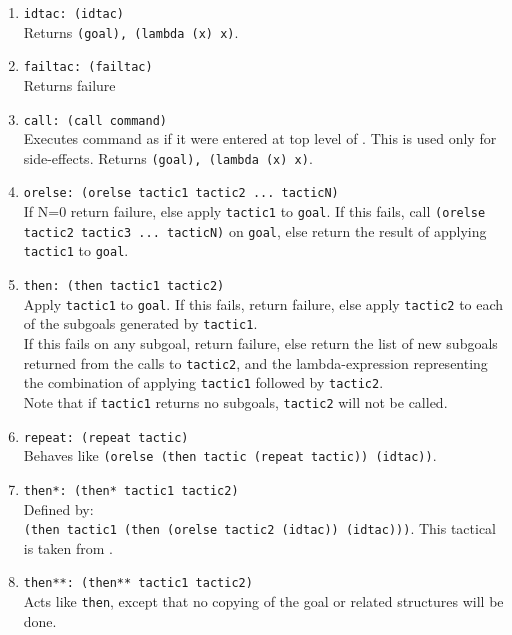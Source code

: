 \begin{enumerate}
\item {\tt idtac: (idtac)} \\
Returns {\tt (goal), (lambda (x) x)}.

\item {\tt failtac: (failtac)}\\
Returns failure

\item {\tt call: (call command)}\\
Executes command as if it were entered at top level of \tps.  This is used
only for side-effects.  Returns {\tt (goal), (lambda (x) x)}.

\item {\tt orelse: (orelse tactic1 tactic2 ... tacticN)}\\
If N=0 return failure, else apply {\tt tactic1} to {\tt goal}. If this fails, call {\tt (orelse tactic2 tactic3 ... tacticN)} on {\tt goal}, else return the result of applying {\tt tactic1} to {\tt goal}.\\

\item {\tt then: (then tactic1 tactic2)}\\
Apply {\tt tactic1} to {\tt goal}. If this fails, return failure, else apply {\tt tactic2} to each of the subgoals generated by {\tt tactic1}.\\
If this fails on any subgoal, return failure, else return the list of new subgoals returned from the calls to {\tt tactic2}, and the lambda-expression representing the combination of applying {\tt tactic1} followed by {\tt tactic2}.\\
Note that if {\tt tactic1} returns no subgoals, {\tt tactic2} will not be called.

\item {\tt repeat: (repeat tactic)}\\
Behaves like {\tt (orelse (then tactic (repeat tactic)) (idtac))}.

\item {\tt then*: (then* tactic1 tactic2)}\\
Defined by:\\
{\tt (then tactic1 (then (orelse tactic2 (idtac)) (idtac)))}.  This tactical is taken from \cite{Felty86}.

\item {\tt then**: (then** tactic1 tactic2)}\\
Acts like {\tt then}, except that no copying of the goal or related structures will be done. 


\end{enumerate}
